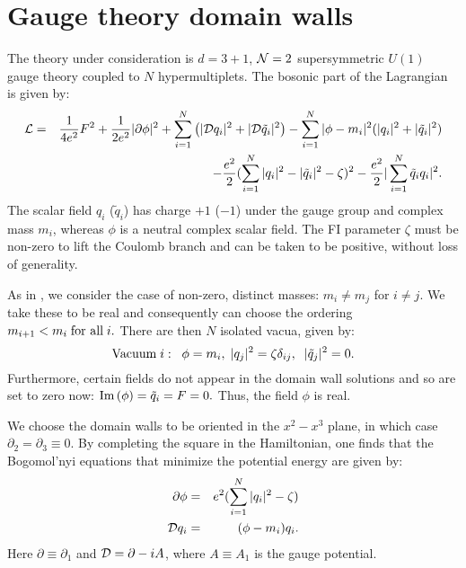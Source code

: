 \documentclass[a4paper,preprint,preprintnumbers,amsmath,amssymb]{revtex4}
\begin{document}
\section{\label{sec:SQED} Gauge theory domain walls}

The theory under consideration is $d=3+1$, ${\cal N}=2$ supersymmetric 
$U(1)$ gauge theory coupled to $N$ hypermultiplets. The bosonic 
part of the Lagrangian is given by:
\begin{eqnarray}
{\cal L}&=&\frac{1}{4e^2}F^2+\frac{1}{2e^2}|\partial\phi|^2 
+\sum_{i=1}^N\left(|{\cal D}q_i|^2+|{\cal D}\tilde{q}_i|^2 
\right) -\sum_{i=1}^N|\phi-m_i|^2(|q_i|^2+|\tilde{q}_i|^2) \nonumber\\ 
&& - \frac{e^2}{2}(\sum_{i=1}^N|q_i|^2-|\tilde{q}_i|^2
-\zeta)^2-\frac{e^2}{2}|\sum_{i=1}^N\tilde{q}_iq_i|^2.
\label{lag}
\end{eqnarray}
The scalar field $q_i$ ($\tilde{q}_i$) has charge $+1$ ($-1$) under the gauge
group and complex mass $m_i$, whereas $\phi$ is a neutral complex scalar field.
The FI parameter $\zeta$ must be non-zero to lift the Coulomb branch and
can be taken to be positive, without loss of generality. 

As in \cite{DT02}, we consider the case of non-zero,  distinct masses: 
$m_i\neq m_j$ for $i\neq j$. We take these to be real and consequently 
can choose the ordering 
$
m_{i+1}<m_i \; \hbox{for all} \; i.
   \label{eq:morder}
$
%
There are then $N$ isolated vacua, given by:
\begin{equation}
  \hbox{Vacuum} \; i: \;\; \phi=m_i, \;  |q_j|^2=\zeta\delta_{ij}, \;\;
  |\tilde{q}_j|^2=0.  
     \label{eq:vacua}
\end{equation}
%
Furthermore, certain fields do not appear in the domain wall solutions
and so are set to zero now:
$
{\rm Im}\,(\phi)=\tilde{q}_i=F=0.
\label{set}
$
Thus, the field $\phi$ is real.

We choose the domain walls to be oriented in the $x^2-x^3$ plane, in which case
$\partial_2 = \partial_3 \equiv 0$. 
By completing the square in the Hamiltonian, one finds that
the Bogomol'nyi equations that minimize the potential energy are given by:
\begin{eqnarray}
\partial\phi&=&e^2(\sum_{i=1}^N|q_i|^2-\zeta) \label{bog1} \\ 
{\cal D}q_i&=&(\phi-m_i)q_i. \label{bog2}
\end{eqnarray}
Here $\partial \equiv \partial_1$ and ${\cal D} = \partial - i A$, where 
$A \equiv A_1$ is the gauge potential.
 
\end{document}
